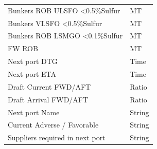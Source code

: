 \begin{table}[!ht]
{\begin{tabular}{ll}
    Bunkers ROB ULSFO \textless 0.5\%Sulfur          & MT                         \\
    Bunkers VLSFO  \textless 0.5\%Sulfur             & MT                         \\
    Bunkers ROB LSMGO \textless 0.1\%Sulfur          & MT                         \\
    FW ROB                                           & MT                         \\
    Next port DTG                                    & Time                       \\
    Next port ETA                                    & Time                       \\
    Draft Current FWD/AFT                            & Ratio                      \\
    Draft Arrival FWD/AFT                            & Ratio                      \\
    Next port Name                                   & String                     \\
    Current Adverse / Favorable                      & String                     \\
    Suppliers required in next port                  & String                     \\
    \bottomrule
    \end{tabular}%
    }
    \label{tab:voyages_raw_parameters}
    \end{table}
